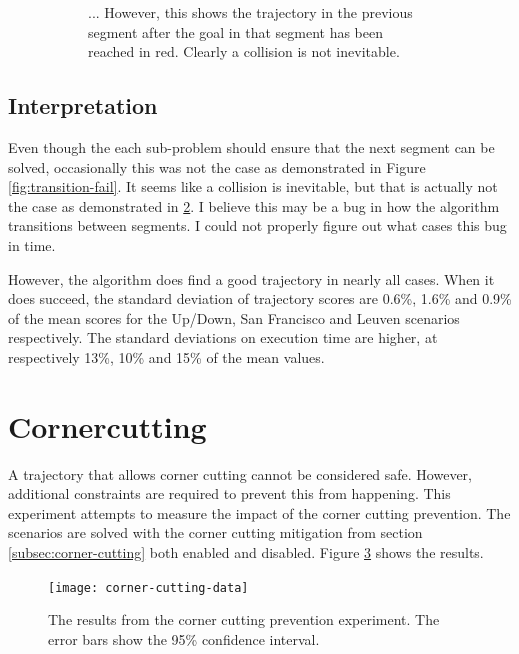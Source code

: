 \begin{figure}[t]
\begin{subfigure}[t]{.45\textwidth}
        		\caption{... However, this shows the trajectory in the previous segment after the goal in that segment has been reached in red. Clearly a collision is not inevitable.}
        		\label{fig:leuven-fail-post}
	\end{subfigure}	
	
        
    \caption[A demonstration that the segment transition failures are not caused by impossible starting states]{}\label{fig:leuven-fail}
\end{figure}
\subsection{Interpretation}
Even though the each sub-problem should ensure that the next segment can be solved, occasionally this was not the case as demonstrated in Figure \ref{fig:transition-fail}. It seems like a collision is inevitable, but that is actually not the case as demonstrated in \ref{fig:leuven-fail}. I believe this may be a bug in how the algorithm transitions between segments. I could not properly figure out what cases this bug in time.
\par
However, the algorithm does find a good trajectory in nearly all cases. When it does succeed, the standard deviation of trajectory scores are 0.6\%, 1.6\% and 0.9\% of the mean scores for the Up/Down, San Francisco and Leuven scenarios respectively. The standard deviations on execution time are higher, at respectively 13\%, 10\% and 15\% of the mean values.






\clearpage
\section{Cornercutting}
\label{subsec:cutting}
A trajectory that allows corner cutting cannot be considered safe. However, additional constraints are required to prevent this from happening. This experiment attempts to measure the impact of the corner cutting prevention. The scenarios are solved with the corner cutting mitigation from section \ref{subsec:corner-cutting} both enabled and disabled. Figure \ref{fig:corner-data} shows the results. 

\begin{figure}[]
	\centering
	\texttt{[image: corner-cutting-data]}
	\caption[The results from the corner cutting prevention experiment]{The results from the corner cutting prevention experiment. The error bars show the 95\% confidence interval.}
	\label{fig:corner-data}
\end{figure}

